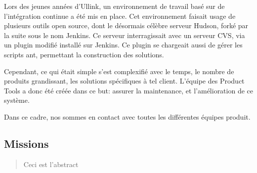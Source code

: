 \documentclass[a4paper, 12pt]{article}
\begin{document}
Lors des jeunes années d'Ullink, un environnement de travail basé sur de l'intégration continue a été mis en place. Cet environnement faisait usage de plusieurs outils open source, dont le désormais célèbre serveur Hudson, forké par la suite sous le nom Jenkins. Ce serveur interragissait avec un serveur CVS, via un plugin modifié installé sur Jenkins. Ce plugin se chargeait aussi de gérer les scripts ant, permettant la construction des solutions.

Cependant, ce qui était simple s'est complexifié avec le temps, le nombre de produits grandissant, les solutions spécifiques à tel client. L'équipe des Product Tools a donc été créée dans ce but: assurer la maintenance, et l'amélioration de ce système.

Dans ce cadre, nos sommes en contact avec toutes les différentes équipes produit.

\subsection{Missions}

\pagebreak
\begin{abstract}
Ceci est l'abstract
\end{abstract}
\end{document}
